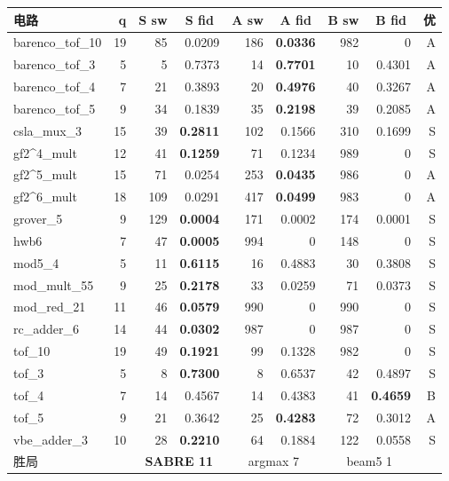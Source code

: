 \begin{table}[htbp]
\centering
\small
\begin{tabular}{lrr|rrr|rrr}
\hline
电路 & q & \multicolumn{1}{c|}{S sw} & \multicolumn{1}{c|}{S fid} & \multicolumn{1}{c|}{A sw} & \multicolumn{1}{c|}{A fid} & \multicolumn{1}{c|}{B sw} & \multicolumn{1}{c|}{B fid} & 优 \\
\hline
barenco\_tof\_10 & 19 & 85 & 0.0209 & 186 & \textbf{0.0336} & 982 & 0 & A \\
barenco\_tof\_3 & 5 & 5 & 0.7373 & 14 & \textbf{0.7701} & 10 & 0.4301 & A \\
barenco\_tof\_4 & 7 & 21 & 0.3893 & 20 & \textbf{0.4976} & 40 & 0.3267 & A \\
barenco\_tof\_5 & 9 & 34 & 0.1839 & 35 & \textbf{0.2198} & 39 & 0.2085 & A \\
csla\_mux\_3 & 15 & 39 & \textbf{0.2811} & 102 & 0.1566 & 310 & 0.1699 & S \\
gf2\^{}4\_mult & 12 & 41 & \textbf{0.1259} & 71 & 0.1234 & 989 & 0 & S \\
gf2\^{}5\_mult & 15 & 71 & 0.0254 & 253 & \textbf{0.0435} & 986 & 0 & A \\
gf2\^{}6\_mult & 18 & 109 & 0.0291 & 417 & \textbf{0.0499} & 983 & 0 & A \\
grover\_5 & 9 & 129 & \textbf{0.0004} & 171 & 0.0002 & 174 & 0.0001 & S \\
hwb6 & 7 & 47 & \textbf{0.0005} & 994 & 0 & 148 & 0 & S \\
mod5\_4 & 5 & 11 & \textbf{0.6115} & 16 & 0.4883 & 30 & 0.3808 & S \\
mod\_mult\_55 & 9 & 25 & \textbf{0.2178} & 33 & 0.0259 & 71 & 0.0373 & S \\
mod\_red\_21 & 11 & 46 & \textbf{0.0579} & 990 & 0 & 990 & 0 & S \\
rc\_adder\_6 & 14 & 44 & \textbf{0.0302} & 987 & 0 & 987 & 0 & S \\
tof\_10 & 19 & 49 & \textbf{0.1921} & 99 & 0.1328 & 982 & 0 & S \\
tof\_3 & 5 & 8 & \textbf{0.7300} & 8 & 0.6537 & 42 & 0.4897 & S \\
tof\_4 & 7 & 14 & 0.4567 & 14 & 0.4383 & 41 & \textbf{0.4659} & B \\
tof\_5 & 9 & 21 & 0.3642 & 25 & \textbf{0.4283} & 72 & 0.3012 & A \\
vbe\_adder\_3 & 10 & 28 & \textbf{0.2210} & 64 & 0.1884 & 122 & 0.0558 & S \\
\hline
胜局 & & \multicolumn{2}{c|}{\textbf{SABRE 11}} & \multicolumn{2}{c|}{argmax 7} & \multicolumn{2}{c}{beam5 1} & \\
\hline
\end{tabular}
\end{table}

